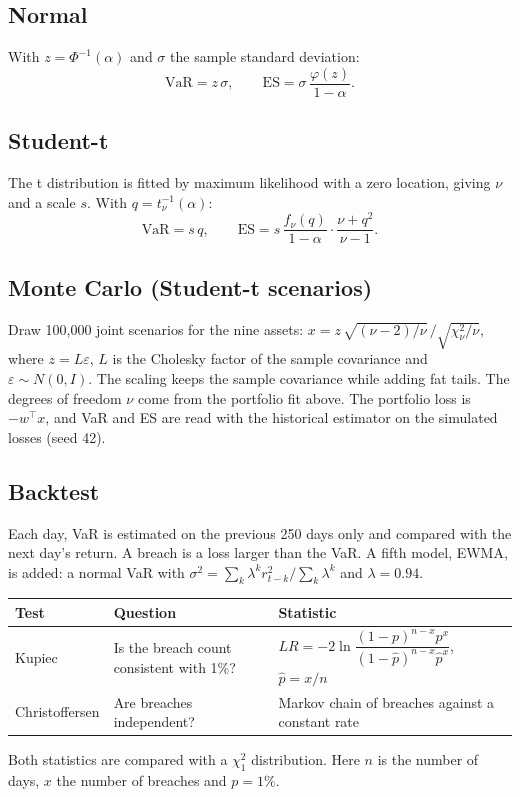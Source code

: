 \documentclass[11pt,a4paper]{article}
\begin{document}
\subsection{Normal}
With $z=\Phi^{-1}(\alpha)$ and $\sigma$ the sample standard deviation:
\[
\mathrm{VaR}=z\,\sigma,\qquad
\mathrm{ES}=\sigma\,\frac{\varphi(z)}{1-\alpha}.
\]

\subsection{Student-t}
The t distribution is fitted by maximum likelihood with a zero location, giving $\nu$ and a scale $s$. With $q=t_\nu^{-1}(\alpha)$:
\[
\mathrm{VaR}=s\,q,\qquad
\mathrm{ES}=s\,\frac{f_\nu(q)}{1-\alpha}\cdot\frac{\nu+q^2}{\nu-1}.
\]

\subsection{Monte Carlo (Student-t scenarios)}
Draw 100,000 joint scenarios for the nine assets: $x = z\,\sqrt{(\nu-2)/\nu}\,/\sqrt{\chi^2_\nu/\nu}$, where $z=L\varepsilon$, $L$ is the Cholesky factor of the sample covariance and $\varepsilon\sim N(0,I)$. The scaling keeps the sample covariance while adding fat tails. The degrees of freedom $\nu$ come from the portfolio fit above. The portfolio loss is $-w^\top x$, and VaR and ES are read with the historical estimator on the simulated losses (seed 42).

\subsection{Backtest}
Each day, VaR is estimated on the previous 250 days only and compared with the next day's return. A breach is a loss larger than the VaR. A fifth model, EWMA, is added: a normal VaR with $\sigma^2=\sum_k \lambda^k r_{t-k}^2 \big/ \sum_k \lambda^k$ and $\lambda=0.94$.

\begin{center}
\begin{tabular}{@{}lp{4.6cm}p{6.2cm}@{}}
\toprule
Test & Question & Statistic \\
\midrule
Kupiec & Is the breach count consistent with 1\%? & $LR=-2\ln\dfrac{(1-p)^{n-x}p^x}{(1-\hat p)^{n-x}\hat p^x}$, $\hat p=x/n$ \\
Christoffersen & Are breaches independent? & Markov chain of breaches against a constant rate \\
\bottomrule
\end{tabular}
\end{center}
Both statistics are compared with a $\chi^2_1$ distribution. Here $n$ is the number of days, $x$ the number of breaches and $p=1\%$.
\end{document}
